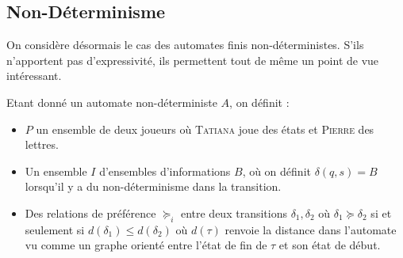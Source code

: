 \documentclass{cours}
\begin{document}
\subsection{Non-Déterminisme}
On considère désormais le cas des automates finis non-déterministes. S'ils n'apportent pas d'expressivité, ils permettent tout de même un point de vue intéressant.
\begin{definition}
    Etant donné un automate non-déterministe $A$, on définit :
    \begin{itemize}
        \item $P$ un ensemble de deux joueurs où \textsc{Tatiana} joue des états et \textsc{Pierre} des lettres.
        \item Un ensemble $I$ d'ensembles d'informations $B$, où on définit $\delta\left(q, s\right) = B$ lorsqu'il y a du non-déterminisme dans la transition.
        \item Des relations de préférence $\succeq_{i}$ entre deux transitions $\delta_{1}, \delta_{2}$ où $\delta_{1} \succeq \delta_{2}$ si et seulement si $d\left(\delta_{1}\right) \leq d(\delta_{2})$ où $d(\tau)$ renvoie la distance dans l'automate vu comme un graphe orienté entre l'état de fin de $\tau$ et son état de début.
    \end{itemize}
\end{definition}
\end{document}
